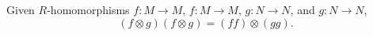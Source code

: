 Given $R$-homomorphisms $f: M \to M$, $f: M \to M$, $g: N \to N$, and $g: N \to N$,
$$(f \otimes g)(f \otimes g) = (f f) \otimes (g g).$$
